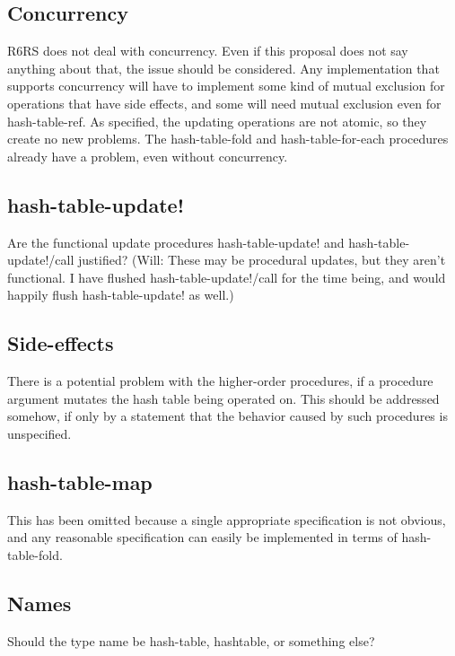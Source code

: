 \documentclass[twoside]{algol60}
\begin{document}
\subsection{Concurrency}
R6RS does not deal with concurrency.  Even if this proposal does not say anything about that, the issue should be considered.  Any implementation that supports concurrency will have to implement some kind of mutual exclusion for operations that have side effects, and some will need mutual exclusion even for {\cf hash-table-ref}.  As specified, the updating operations are not atomic, so they create no new problems.  The {\cf hash-table-fold} and {\cf hash-table-for-each} procedures already have a problem, even without concurrency.

\subsection{hash-table-update!}
Are the functional update procedures {\cf hash-table-update!} and 
{\cf hash-table-update!/call} justified?  (Will: These may be
procedural updates, but they aren't functional.  I have flushed
{\cf hash-table-update!/call} for the time being, and would happily
flush {\cf hash-table-update!} as well.)

\subsection{Side-effects}
There is a potential problem with the higher-order procedures, if a procedure argument mutates the hash table being operated on.  This should be addressed somehow, if only by a statement that the behavior caused by such procedures is unspecified.

\subsection{hash-table-map}
This has been omitted because a single appropriate specification is not obvious, and any reasonable specification can easily be implemented in terms of {\cf hash-table-fold}.

\subsection{Names}
Should the type name be {\cf hash-table}, {\cf hashtable}, or something else?


\end{document}
